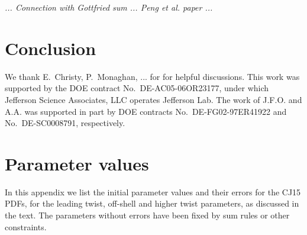 \documentclass[aps,prd,amsmath,preprint]{revtex4}
\begin{document}
{\it
... Connection with Gottfried sum ... Peng et al. paper ...
}



\section{Conclusion}
\label{sec:conclusion}



\acknowledgments

We thank E.~Christy, P.~Monaghan, ... for for helpful discussions.
This work was supported by the DOE contract No.~DE-AC05-06OR23177,
under which Jefferson Science Associates, LLC operates Jefferson Lab.
The work of J.F.O. and A.A. was supported in part by DOE contracts
No.~DE-FG02-97ER41922 and No.~DE-SC0008791, respectively.


\newpage
\appendix
\section{Parameter values}
\label{app:param}

In this appendix we list the initial parameter values and their errors
for the CJ15 PDFs, for the leading twist, off-shell and higher twist
parameters, as discussed in the text.  The parameters without errors
have been fixed by sum rules or other constraints.
\end{document}
